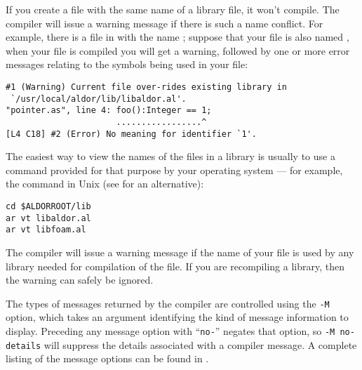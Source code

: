 
If you create a  file with the same name of a library file,
it won't compile. The compiler will issue a warning message if there
is such a name conflict.  For example, there is a file in \libaldor{}
with the name ; suppose that your file is also named
, when your file is compiled you will get a
warning, followed by one or more error messages
relating to the symbols being used in your file:
{\small
\begin{verbatim}
#1 (Warning) Current file over-rides existing library in
 `/usr/local/aldor/lib/libaldor.al'.
"pointer.as", line 4: foo():Integer == 1;
                      .................^
[L4 C18] #2 (Error) No meaning for identifier `1'.
\end{verbatim}
}
The easiest way to view the names of the files in a library is usually
to use a command provided for that purpose by your operating system ---
for example, the  command in Unix (see 
for an alternative):
{\small
\begin{verbatim}
cd $ALDORROOT/lib
ar vt libaldor.al
ar vt libfoam.al
\end{verbatim}
}

The compiler will issue a warning message if the name of your file is
used by any library needed for compilation of the file.
If you are recompiling a library, then the warning can safely be
ignored.



The types of messages returned by the \asharp{} compiler are controlled
using the {\tt -M} option, which takes an argument identifying the
kind of message information to display.
Preceding any message option with ``\verb+no-+'' negates that option, 
so {\tt -M no-details} will suppress the details associated with a compiler 
message.  A complete listing of the message options can be found in 
.


